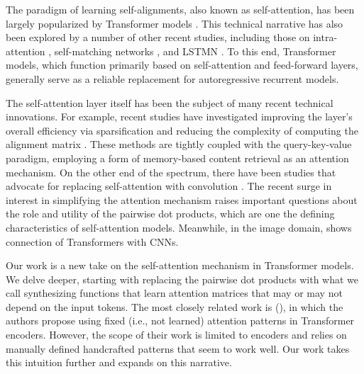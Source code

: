 \documentclass{article}
\begin{document}
The paradigm of learning self-alignments, also known as self-attention, has been largely popularized by Transformer models \citep{vaswani2017attention}. This technical narrative has also been explored by a number of other recent studies, including those on intra-attention \citep{parikh2016decomposable}, self-matching networks \citep{wang2017gated}, and LSTMN \citep{cheng2016long}. To this end, Transformer models, which function primarily based on self-attention and feed-forward layers, generally serve as a reliable replacement for autoregressive recurrent models. 

The self-attention layer itself has been the subject of many recent technical innovations. For example, recent studies have investigated improving the layer's overall efficiency via sparsification and reducing the complexity of computing the alignment matrix \citep{child2019generating,kitaev2020reformer,huang2018music,tay2020sparse,Beltagy2020Longformer}. These methods are tightly coupled with the query-key-value paradigm, employing a form of memory-based content retrieval as an attention mechanism. On the other end of the spectrum, there have been studies that advocate for replacing self-attention with convolution \citep{wu2019pay}. The recent surge in interest in simplifying the attention mechanism raises important questions about the role and  utility of the pairwise dot products, which are one the defining characteristics of self-attention models. Meanwhile, in the image domain, \citep{cordonnier2019relationship} shows connection of Transformers with CNNs.

Our work is a new take on the self-attention mechanism in Transformer models. We delve deeper, starting with replacing the pairwise dot products with what we call synthesizing functions that learn attention matrices that may or may not depend on the input tokens. The most closely related work is (\citep{raganato2020fixed}), in which the authors propose using fixed (i.e., not learned) attention patterns in Transformer encoders. However, the scope of their work is limited to encoders and relies on manually defined handcrafted patterns that seem to work well. Our work takes this intuition further and expands on this narrative.
\end{document}
